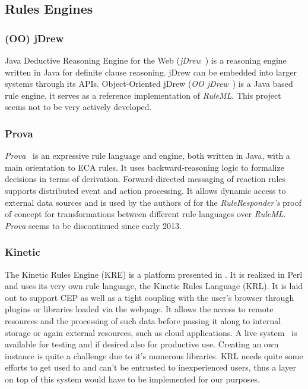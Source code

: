 \subsection{Rules Engines}
\subsubsection{(OO) jDrew}
Java Deductive Reasoning Engine for the Web (\emph{jDrew}~\cite{wwwjdrew}) is a reasoning engine written in Java for definite clause reasoning. jDrew can be embedded into larger systems through its APIs.
Object-Oriented jDrew (\emph{OO jDrew}~\cite{2005-Ball_etal-OOjDrew.pdf,wwwoojdrew}) is a Java based rule engine, it serves as a reference implementation of \emph{RuleML}. This project seems not to be very actively developed.

\subsubsection{Prova}
\emph{Prova}~\cite{wwwprova} is an expressive rule language and engine, both written in Java, with a main orientation to ECA rules. It uses backward-reasoning logic to formalize decisions in terms of derivation. Forward-directed messaging of reaction rules supports distributed event and action processing. It allows dynamic access to external data sources and is used by the authors of \cite{2013_Zhao-Paschke_EDSWE.pdf,2007-Paschke_etal-RuleResponder.pdf} for the \emph{RuleResponder's} proof of concept for transformations between different rule languages over \emph{RuleML}. \emph{Prova} seems to be discontinued since early 2013. 

\subsubsection{Kinetic}
The Kinetic Rules Engine (KRE) is a platform presented in \cite{bookTheLiveWeb}. It is realized in Perl and uses its very own rule language, the Kinetic Rules Language (KRL). It is laid out to support CEP as well as a tight coupling with the user's browser through plugins or libraries loaded via the webpage. It allows the access to remote resources and the processing of such data before passing it along to internal storage or again external resources, such as cloud applications. A live system~\cite{wwwkynetx} is available for testing and if desired also for productive use. Creating an own instance is quite a challenge due to it's numerous libraries. KRL needs quite some efforts to get used to and can't be entrusted to inexperienced users, thus a layer on top of this system would have to be implemented for our purposes.


